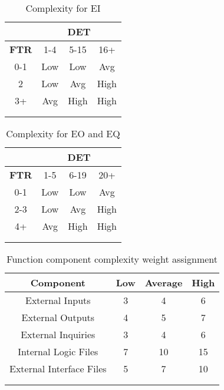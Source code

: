 \begin{longtable}{cccc}
\toprule
\multicolumn{1}{c}{} & 
\multicolumn{3}{c}{\textbf{DET}}\\
\midrule
\textbf{FTR} & 1-4 & 5-15 & 16+ \\
\midrule
0-1	&	Low	&	Low		&	Avg \\
2	&	Low	&	Avg		&	High \\
3+	&	Avg	&	High	&	High\\
\bottomrule \\
\caption{ Complexity for EI}
\label{tbl:complexityEI}
\end{longtable}

\clearpage

\begin{longtable}{cccc}
\toprule
\multicolumn{1}{c}{} & 
\multicolumn{3}{c}{\textbf{DET}}\\
\midrule
\textbf{FTR} & 1-5 & 6-19 & 20+ \\
\midrule
0-1	&	Low	&	Low		&	Avg \\
2-3	&	Low	&	Avg		&	High \\
4+	&	Avg	&	High	&	High\\
\bottomrule \\
\caption{Complexity for EO and EQ}
\label{tbl:complexityEO_EQ}
\end{longtable}



\begin{longtable}{cccc}
\toprule
Component				&	Low	&	Average	&	High \\
\midrule
External Inputs			&	3	&	4		&	6 \\
External Outputs		&	4	&	5		&	7 \\
External Inquiries		&	3	&	4		&	6 \\
Internal Logic Files	&	7	&	10		&	15 \\
External Interface Files&	5	&	7		&	10 \\
\bottomrule \\
\caption{Function component complexity weight assignment}
\label{tbl:complexityWeight}
\end{longtable}

